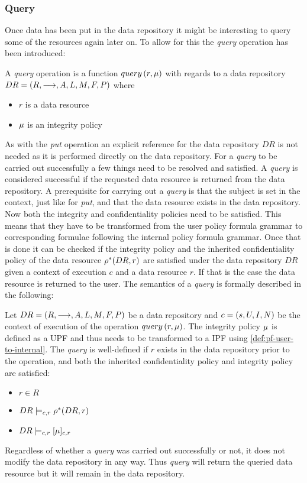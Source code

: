 \subsubsection{Query}\label{sec:query}
Once data has been put in the data repository it might be interesting to query some of the resources again later on. To allow for this the \emph{query} operation has been introduced:
\begin{definition}
A \emph{query} operation is a function $query \left( r, \mu \right)$ with regards to a data repository $DR= \left( R, \longrightarrow, A, L, M, F, P \right)$ where
\begin{itemize}
  \item $r$ is a data resource
  \item $\mu$ is an integrity policy
\end{itemize}
\end{definition}
As with the \emph{put} operation an explicit reference for the data repository $DR$ is not needed as it is performed directly on the data repository. For a \emph{query} to be carried out successfully a few things need to be resolved and satisfied. A \emph{query} is considered successful if the requested data resource is returned from the data repository. A prerequisite for carrying out a \emph{query} is that the subject is set in the context, just like for \emph{put}, and that the data resource exists in the data repository. Now both the integrity and confidentiality policies need to be satisfied. This means that they have to be transformed from the user policy formula grammar to corresponding formulae following the internal policy formula grammar. Once that is done it can be checked if the integrity policy and the inherited confidentiality policy of the data resource $\rho^{\ast}(DR,r)$ are satisfied under the data repository $DR$ given a context of execution $c$ and a data resource $r$. If that is the case the data resource is returned to the user.
The semantics of a \emph{query} is formally described in the following:
\begin{definition}
Let $DR= \left( R, \longrightarrow, A, L, M, F, P \right)$ be a data repository and $c = \left( s, U, I, N \right)$ be the context of execution of the operation $query \left( r, \mu \right)$. The integrity policy $\mu$ is defined as a UPF and thus needs to be transformed to a IPF using \autoref{def:pf-user-to-internal}.
The \emph{query} is well-defined if $r$ exists in the data repository prior to the operation, and both the inherited confidentiality policy and integrity policy are satisfied:
\begin{itemize}
    \item $r \in R$
    \item $DR \models_{c,r} \rho^{\ast}(DR, r)$
    \item $DR \models_{c,r} [\mu]_{c,r}$
\end{itemize}
\end{definition}

Regardless of whether a \emph{query} was carried out successfully or not, it does not modify the data repository in any way. Thus \emph{query} will return the queried data resource but it will remain in the data repository. 
